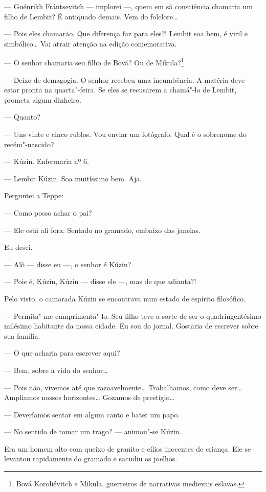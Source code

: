 --- Guénrikh Frántsevitch --- implorei ---, quem em sã consciência
chamaria um filho de Lembit? É antiquado demais. Vem do folclore\ldots{}

--- Pois eles chamarão. Que diferença faz para eles?! Lembit soa bem, é
viril e simbólico\ldots{} Vai atrair atenção na edição comemorativa.

--- O senhor chamaria seu filho de Bová? Ou de Mikula?\footnote{Bová
  Koroliévitch e Mikula, guerreiros de narrativas medievais eslavas.}

--- Deixe de demagogia. O senhor recebeu uma incumbência. A matéria deve
estar pronta na quarta"-feira. Se eles se recusarem a chamá"-lo de Lembit,
prometa algum dinheiro.

--- Quanto?

--- Uns vinte e cinco rublos. Vou enviar um fotógrafo. Qual é o
sobrenome do recém"-nascido?

--- Kúzin. Enfermaria nº 6.

--- Lembit Kúzin. Soa muitíssimo bem. Aja.

Perguntei a Teppe:

--- Como posso achar o pai?

--- Ele está ali fora. Sentado no gramado, embaixo das janelas.

Eu desci.

--- Alô --- disse eu ---, o senhor é Kúzin?

--- Pois é, Kúzin, Kúzin --- disse ele ---, mas de que adianta?!

Pelo visto, o camarada Kúzin se encontrava num estado de espírito
filosófico.

--- Permita"-me cumprimentá"-lo. Seu filho teve a sorte de ser o
quadringentésimo milésimo habitante da nossa cidade. Eu sou do jornal.
Gostaria de escrever sobre sua família.

--- O que acharia para escrever aqui?

--- Bem, sobre a vida do senhor\ldots{}

--- Pois não, vivemos até que razoavelmente\ldots{} Trabalhamos, como deve
ser\ldots{} Ampliamos nossos horizontes\ldots{} Gozamos de prestígio\ldots{}

--- Deveríamos sentar em algum canto e bater um papo.

--- No sentido de tomar um trago? --- animou"-se Kúzin.

Era um homem alto com queixo de granito e cílios inocentes de criança.
Ele se levantou rapidamente do gramado e sacudiu os joelhos.

